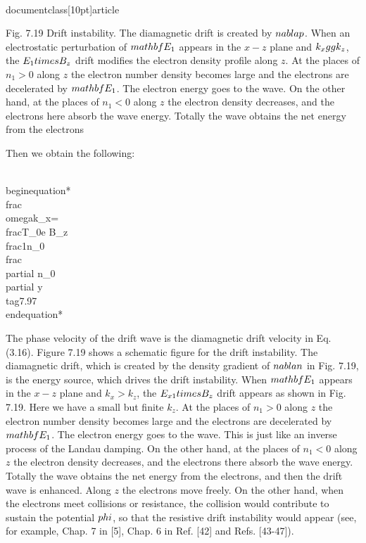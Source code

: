 \\documentclass[10pt]{article}
\begin{document}
{{{{Fig. 7.19 Drift instability. The diamagnetic drift is created by $\\nabla p$. When an electrostatic perturbation of $\\mathbf{E}_{1}$ appears in the $x-z$ plane and $k_{x} \\gg k_{z}$, the $E_{1} \\times B_{z}$ drift modifies the electron density profile along $z$. At the places of $n_{1}>0$ along $z$ the electron number density becomes large and the electrons are decelerated by $\\mathbf{E}_{1}$. The electron energy goes to the wave. On the other hand, at the places of $n_{1}<0$ along $z$ the electron density decreases, and the electrons here absorb the wave energy. Totally the wave obtains the net energy from the electrons

Then we obtain the following:


\\begin{equation*}
\\frac{\\omega}{k_{x}}=\\frac{T_{0}}{e B_{z}} \\frac{1}{n_{0}} \\frac{\\partial n_{0}}{\\partial y} \\tag{7.97}
\\end{equation*}


The phase velocity of the drift wave is the diamagnetic drift velocity in Eq. (3.16). Figure 7.19 shows a schematic figure for the drift instability. The diamagnetic drift, which is created by the density gradient of $\\nabla n$ in Fig. 7.19, is the energy source, which drives the drift instability. When $\\mathbf{E}_{1}$ appears in the $x-z$ plane and $k_{x}>k_{z}$, the $E_{x 1} \\times B_{z}$ drift appears as shown in Fig. 7.19. Here we have a small but finite $k_{z}$. At the places of $n_{1}>0$ along $z$ the electron number density becomes large and the electrons are decelerated by $\\mathbf{E}_{1}$. The electron energy goes to the wave. This is just like an inverse process of the Landau damping. On the other hand, at the places of $n_{1}<0$ along $z$ the electron density decreases, and the electrons there absorb the wave energy. Totally the wave obtains the net energy from the electrons, and then the drift wave is enhanced. Along $z$ the electrons move freely. On the other hand, when the electrons meet collisions or resistance, the collision would contribute to sustain the potential $\\phi$, so that the resistive drift instability would appear (see, for example, Chap. 7 in [5], Chap. 6 in Ref. [42] and Refs. [43-47]).

}}}}
\end{document}

